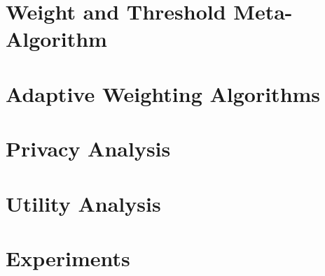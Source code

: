 \documentclass[11pt]{article}
\begin{document}
% 
\section{Weight and Threshold Meta-Algorithm}\label{sec:meta-algo}


\section{Adaptive Weighting Algorithms}\label{sec:algo}


\section{Privacy Analysis}\label{sec:privacy}


\section{Utility Analysis}\label{sec:utility}


\section{Experiments}\label{sec:experiments}



\clearpage





\clearpage
\appendix


\end{document}
